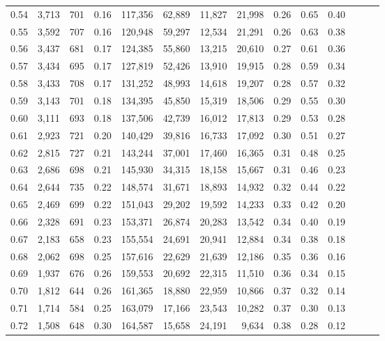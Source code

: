 \begin{tabular}{rrrrrrrrrrrrrr}
0.54 &  3,713 &  701 &  0.16 &  117,356 &   62,889 &  11,827 &  21,998 &  0.26 &  0.65 &      0.40 \\
0.55 &  3,592 &  707 &  0.16 &  120,948 &   59,297 &  12,534 &  21,291 &  0.26 &  0.63 &      0.38 \\
0.56 &  3,437 &  681 &  0.17 &  124,385 &   55,860 &  13,215 &  20,610 &  0.27 &  0.61 &      0.36 \\
0.57 &  3,434 &  695 &  0.17 &  127,819 &   52,426 &  13,910 &  19,915 &  0.28 &  0.59 &      0.34 \\
0.58 &  3,433 &  708 &  0.17 &  131,252 &   48,993 &  14,618 &  19,207 &  0.28 &  0.57 &      0.32 \\
0.59 &  3,143 &  701 &  0.18 &  134,395 &   45,850 &  15,319 &  18,506 &  0.29 &  0.55 &      0.30 \\
0.60 &  3,111 &  693 &  0.18 &  137,506 &   42,739 &  16,012 &  17,813 &  0.29 &  0.53 &      0.28 \\
0.61 &  2,923 &  721 &  0.20 &  140,429 &   39,816 &  16,733 &  17,092 &  0.30 &  0.51 &      0.27 \\
0.62 &  2,815 &  727 &  0.21 &  143,244 &   37,001 &  17,460 &  16,365 &  0.31 &  0.48 &      0.25 \\
0.63 &  2,686 &  698 &  0.21 &  145,930 &   34,315 &  18,158 &  15,667 &  0.31 &  0.46 &      0.23 \\
0.64 &  2,644 &  735 &  0.22 &  148,574 &   31,671 &  18,893 &  14,932 &  0.32 &  0.44 &      0.22 \\
0.65 &  2,469 &  699 &  0.22 &  151,043 &   29,202 &  19,592 &  14,233 &  0.33 &  0.42 &      0.20 \\
0.66 &  2,328 &  691 &  0.23 &  153,371 &   26,874 &  20,283 &  13,542 &  0.34 &  0.40 &      0.19 \\
0.67 &  2,183 &  658 &  0.23 &  155,554 &   24,691 &  20,941 &  12,884 &  0.34 &  0.38 &      0.18 \\
0.68 &  2,062 &  698 &  0.25 &  157,616 &   22,629 &  21,639 &  12,186 &  0.35 &  0.36 &      0.16 \\
0.69 &  1,937 &  676 &  0.26 &  159,553 &   20,692 &  22,315 &  11,510 &  0.36 &  0.34 &      0.15 \\
0.70 &  1,812 &  644 &  0.26 &  161,365 &   18,880 &  22,959 &  10,866 &  0.37 &  0.32 &      0.14 \\
0.71 &  1,714 &  584 &  0.25 &  163,079 &   17,166 &  23,543 &  10,282 &  0.37 &  0.30 &      0.13 \\
0.72 &  1,508 &  648 &  0.30 &  164,587 &   15,658 &  24,191 &   9,634 &  0.38 &  0.28 &      0.12 \\

\end{tabular}
